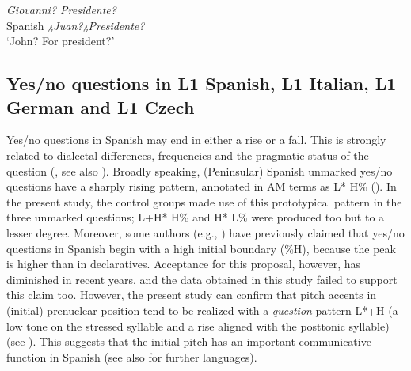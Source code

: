 \ex\label{ex:4:13}     \textit{Giovanni? Presidente?}\\
Spanish   \textit{¿Juan?¿Presidente?}\\
{}      {‘John? For president?’}\\
\z



\subsection{Yes/no questions in L1 Spanish, L1 Italian, L1 German and L1 Czech}\label{sec:4.3.1}

Yes/no questions in Spanish may end in either a rise or a fall. This is strongly related to dialectal differences, frequencies and the pragmatic status of the question (\citealt[371]{HualdePrieto2015}, see also  \citealt{NavarroTomás1948, Quilis1987, Sosa1999, Face2005,Face2008}). Broadly speaking, (Peninsular) Spanish unmarked yes/no questions have a sharply rising pattern, annotated in AM terms as L* H\% (\citealt{PrietoRoseano2010, HualdePrieto2015}). In the present study, the control groups made use of this prototypical pattern in the three unmarked questions; L+H* H\% and H* L\% were produced too but to a lesser degree. Moreover, some authors (e.g.,  \citealt{NavarroTomás1948, CanelladaKuhlmannMadsen1987, Sosa1999}) have previously claimed that yes/no questions in Spanish begin with a high initial boundary (\%H), because the peak is higher than in declaratives. Acceptance for this proposal, however, has diminished in recent years, and the data obtained in this study failed to support this claim too. However, the present study can confirm that pitch accents in (initial) prenuclear position tend to be realized with a \textit{question}{}-pattern L*+H (a low tone on the stressed syllable and a rise aligned with the posttonic syllable) (see ). This suggests that the initial pitch has an important communicative function in Spanish (see also \citealt{SicoliEtAl2015} for further languages).

